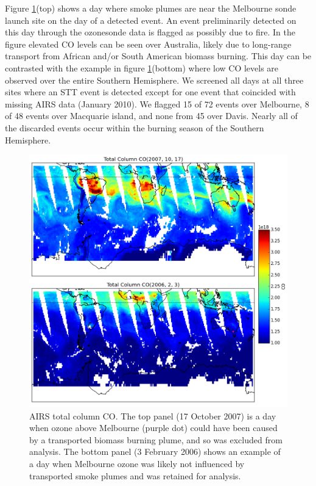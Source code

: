 \documentclass{article}
\begin{document}
    Figure \ref{fig:excludedeg}(top) shows a day where smoke plumes are near the Melbourne sonde launch site on the day of a detected event. 
    An event preliminarily detected on this day through the ozonesonde data is flagged as possibly due to fire.
    In the figure elevated CO levels can be seen over Australia, likely due to long-range transport from African and/or South American biomass burning.
    This day can be contrasted with the example in figure \ref{fig:excludedeg}(bottom) where low CO levels are observed over the entire Southern Hemisphere.
    We screened all days at all three sites where an STT event is detected except for one event that coincided with missing AIRS data (January 2010). 
    We flagged 15 of 72 events over Melbourne, 8 of 48 events over Macquarie island, and none from 45 over Davis.
    Nearly all of the discarded events occur within the burning season of the Southern Hemisphere.
    
    \begin{figure}[!htbp]
      \includegraphics[width=\textwidth]{figures/AIRS_compare.png}
      \caption{AIRS total column CO.
      The top panel (17 October 2007) is a day when ozone above Melbourne (purple dot) could have been caused by a transported biomass burning plume, and so was excluded from analysis.
      The bottom panel (3 February 2006) shows an example of a day when Melbourne ozone was likely not influenced by transported smoke plumes and was retained for analysis.}
      \label{fig:excludedeg}
    \end{figure}
    
\end{document}
